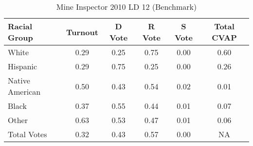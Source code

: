 \begin{table}[htb]
\begin{center}
\caption{Mine Inspector 2010 LD 12 (Benchmark)}
\label{smine_cvap_ld_12_benchmark}
\begin{tabular}{lccccc}
  \hline
Racial Group & Turnout & D Vote & R Vote & S Vote & Total CVAP \\ 
  \hline
White & 0.29  & 0.25  & 0.75  & 0.00  & 0.60 \\
    Hispanic & 0.29  & 0.75  & 0.25  & 0.00  & 0.26 \\
    Native American & 0.50  & 0.43  & 0.54  & 0.02  & 0.01 \\
    Black & 0.37  & 0.55  & 0.44  & 0.01  & 0.07 \\
    Other & 0.63  & 0.53  & 0.47  & 0.01  & 0.06 \\
    Total Votes & 0.32  & 0.43  & 0.57  & 0.00  &  NA \\

   \hline
\end{tabular}
\end{center}
\end{table}
